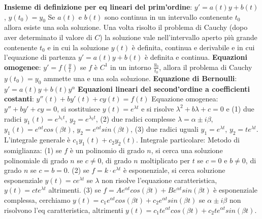 \documentclass[fontsize=8pt]{scrartcl}
\begin{document}
\begin{multicols*}{4}
\textbf{Insieme di definizione per eq lineari del prim'ordine}:\newline
$y' = a(t) y + b(t)$, $y(t_0) = y_0$\newline
Se $a(t)$ e $b(t)$ sono continua in un intervallo contenente $t_0$ allora esiste una sola soluzione.\newline
Una volta risolto il problema di Cauchy (dopo aver determinato il valore di $C$) la soluzione vale nell'intervallo aperto più grande contenente $t_0$ e in cui la soluzione $y(t)$ è definita, continua e derivabile e in cui l'equazione di partenza $y' = a(t) y + b(t)$ è definita e continua.\newline
\textbf{Equazioni omogenee}:\newline
$y' = f\left(\frac{y}{t}\right)$\newline
se $f$ è $C^1$ in un intorno $\frac{y_0}{t_0}$, allora il problema di Cauchy $y(t_0) = y_0$ ammette una e una sola soluzione.\newline
\textbf{Equazione di Bernoulli}:\newline
$y' = a(t) y +b(t) y^\alpha$\newline
\textbf{Equazioni lineari del second'ordine a coefficienti costanti}:\newline
$y''(t) + by'(t) + cy(t) = f(t)$\newline
Equazione omogenea: $y'' + b y' + cy = 0$, si sostituisce $y(t) = e^{\lambda t}$ e si risolve $\lambda^2 + b \lambda + c = 0$ e (1) due radici $y_1(t) = e^{\lambda_1 t}$, $y_2 = e^{\lambda_2 t}$, (2) due radici complesse $\lambda = \alpha \pm i \beta$, $y_1(t) = e^{\alpha t} cos(\beta t)$, $y_2 = e^{\alpha t} sin(\beta t)$, (3) due radici uguali $y_1 = e^{\lambda t}$, $y_2 = t e^{\lambda t}$. L'integrale generale è $c_1y_1(t) + c_2 y_2(t)$.\newline
Integrale particolare: Metodo di somiglianza:\newline
(1) se $f$ è un polinomio di grado $n$, si cerca una soluzione polinomiale di grado $n$ se $c\neq 0$, di grado $n$ moltiplicato per $t$ se $c=0$ e $b\neq 0$, di grado $n$ se $c=b=0$.\newline
(2) se $f = k \cdot  e^{\lambda t}$ è esponenziale, si cerca soluzione esponenziale $y(t) = ce^{\lambda t}$ se $\lambda$ non risolve l'equazione caratteristica, $y(t) = cte^{\lambda t}$ altrimenti.\newline
(3) se $f = Ae^{\alpha t} cos(\beta t) + B e^{\alpha t} sin(\beta t)$ è esponenziale complessa, cerchiamo $y(t) =  c_1 e^{\alpha t} cos(\beta t) + c_2 e^{\alpha t} sin(\beta t)$ se $\alpha \pm i \beta$ non risolvono l'eq caratteristica, altrimenti $y(t) = c_1 t e^{\alpha t} cos(\beta t) + c_2 t e^{\alpha t}sin(\beta t)$.\newline

\end{multicols*}
\end{document}
